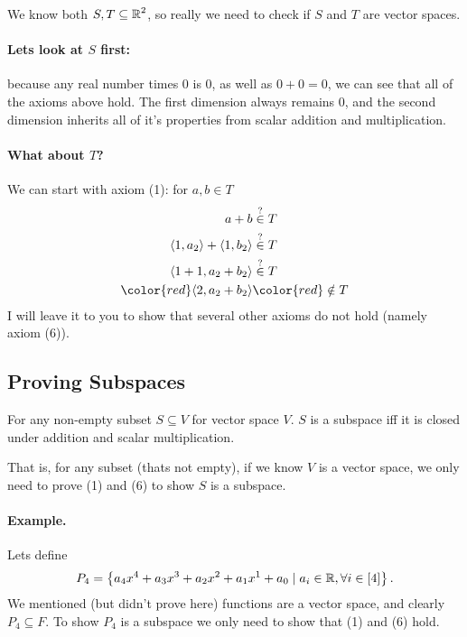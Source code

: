 We know both $S, T \subseteq \operatorname{\mathbb{R}}^2$, so really we need to check if $S$ and $T$ are vector spaces. 

\paragraph{Lets look at $S$ first: }
because any real number times 0 is 0, as well as $0+0=0$, we can see that all of the axioms above hold. 
The first dimension always remains $0$, and the second dimension inherits all of it's properties from scalar addition and multiplication. 

\paragraph{What about $T$? }
We can start with axiom (1): 
for $a,b \in T$
\[\begin{aligned}
a + b & \stackrel{?}{\in}  T\\
\langle 1,a_2\rangle + \langle 1, b_2\rangle & \stackrel{?}{\in}  T\\
\langle 1+1,a_2+b_2\rangle & \stackrel{?}{\in}  T\\
\color{red} \langle 2,a_2+b_2\rangle& \color{red}\notin T\\
\end{aligned}\]
I will leave it to you to show that several other axioms do not hold (namely axiom (6)). 

\subsection{Proving Subspaces}
For any non-empty subset $S\subseteq V$ for vector space $V$. 
$S$ is a subspace iff it is closed under addition and scalar multiplication. 

That is, for any subset (thats not empty), if we know $V$ is a vector space, we only need to prove (1) and (6) to show $S$ is a subspace. 

\paragraph{Example.}
Lets define \[P_4 = \left\{a_4x^4 + a_3x^3 + a_2x^2 + a_1x^1 + a_0 \mid a_i\in \operatorname{\mathbb{R}}, \forall i \in [4] \right\}.\]
We mentioned (but didn't prove here) functions are a vector space, and clearly $P_4 \subseteq F$. 
To show $P_4$ is a subspace we only need to show that (1) and (6) hold. 

